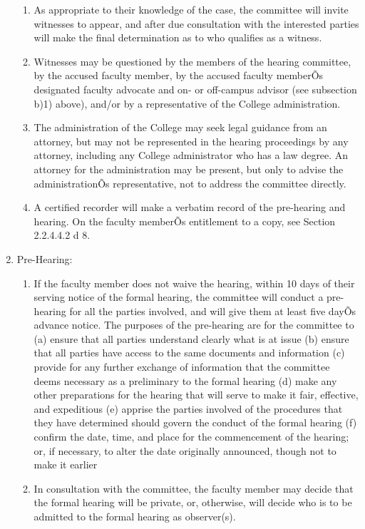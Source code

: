 \documentclass[letterpaper, 11pt]{article}
\begin{document}
\begin{enumerate}[label=\alph*)]
{\begin{enumerate}[label=\arabic*)]
							\item{As appropriate to their knowledge of the case, the committee will invite witnesses to appear, and after due consultation with the interested parties will make the final determination as to who qualifies as a witness.}
							\item{Witnesses may be questioned by the members of the hearing committee, by the accused faculty member, by the accused faculty memberÕs designated faculty advocate and on- or off-campus advisor (see subsection b)1) above), and/or by a representative of the College administration.}
							\item{The administration of the College may seek legal guidance from an attorney, but may not be represented in the hearing proceedings by any attorney, including any College administrator who has a law degree.  An attorney for the administration may be present, but only to advise the administrationÕs representative, not to address the committee directly.}
							\item{A certified recorder will make a verbatim record of the pre-hearing and hearing.
								On the faculty memberÕs entitlement to a copy, see Section 2.2.4.4.2 d 8. }
						\end{enumerate}
					}
					\item{Pre-Hearing:
						\begin{enumerate}[label=\arabic*)]
							\item{If the faculty member does not waive the hearing, within 10 days of their serving notice of the formal hearing, the committee will conduct a pre-hearing for all the parties involved, and will give them at least five dayÕs advance notice.  The purposes of the pre-hearing are for the committee to}
							(a) ensure that all parties understand clearly what is at issue
							(b) ensure that all parties have access to the same documents and information
							(c) provide for any further exchange of information that the committee deems necessary as a preliminary to the formal hearing
							(d) make any other preparations for the hearing that will serve to make it fair, effective, and expeditious
							(e) apprise the parties involved of the procedures that they have determined should govern the conduct of the formal hearing
							(f) confirm the date, time, and place for the commencement of the hearing; or, if necessary, to alter the date originally announced, though not to make it earlier
							\item{In consultation with the committee, the faculty member may decide that the formal hearing will be private, or, otherwise, will decide who is to be admitted to the formal hearing as observer(s).}

\end{enumerate}}
\end{enumerate}
\end{document}
